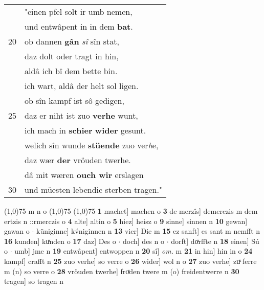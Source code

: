 \documentclass[8pt,a4paper,notitlepage]{article}
\begin{document}
\begin{table}[ht]
\begin{minipage}[t]{0.5\linewidth}
\begin{tabular}{rl}
 & "einen pfel solt ir umb nemen,\\ 
 & und entwâpent in in dem \textbf{bat}.\\ 
20 & ob dannen \textbf{gân} \textit{sî} sîn stat,\\ 
 & daz dolt oder tragt in hin,\\ 
 & aldâ ich bî dem bette bin.\\ 
 & ich wart, aldâ der helt sol ligen.\\ 
 & ob sîn kampf ist sô gedigen,\\ 
25 & daz er niht ist zuo \textbf{verhe} wunt,\\ 
 & ich mach in \textbf{schier} \textbf{wider} gesunt.\\ 
 & welich sîn wunde \textbf{stüende} zuo ver\textit{h}e,\\ 
 & daz wær \textbf{der} vröuden twerhe.\\ 
 & dâ mit wæren \textbf{ouch wir} erslagen\\ 
30 & und müesten lebendic sterben tragen."\\ 
\end{tabular}
\scriptsize
\line(1,0){75} \newline
m n o \newline
\line(1,0){75} \newline
\newline
\line(1,0){75} \newline
\textbf{1} machet] machen o \textbf{3} de merzîs] demerczis m dem ertzis n ::rmerczis o \textbf{4} alte] altin o \textbf{5} hiez] heisz o \textbf{9} sinne] sinnen n \textbf{10} gewan] gawan o  $\cdot$ küniginne] kv́niginnen n \textbf{13} vier] Die m \textbf{15} ez sanft] es sant m nemfft n \textbf{16} kunden] kuͯnden o \textbf{17} daz] Des o  $\cdot$ doch] des n o  $\cdot$ dorft] doͯrffte n \textbf{18} einen] Sú o  $\cdot$ umb] jme n \textbf{19} entwâpent] entwoppen n \textbf{20} sî] \textit{om.} m \textbf{21} in hin] hin in o \textbf{24} kampf] crafft n \textbf{25} zuo verhe] so verre o \textbf{26} wider] wol n o \textbf{27} zuo verhe] zuͯ ferre m (n) so verre o \textbf{28} vröuden twerhe] froͯden twere m (o) freidentwerre n \textbf{30} tragen] so tragen n \newline
\end{minipage}
\end{table}
\newpage
\end{document}
